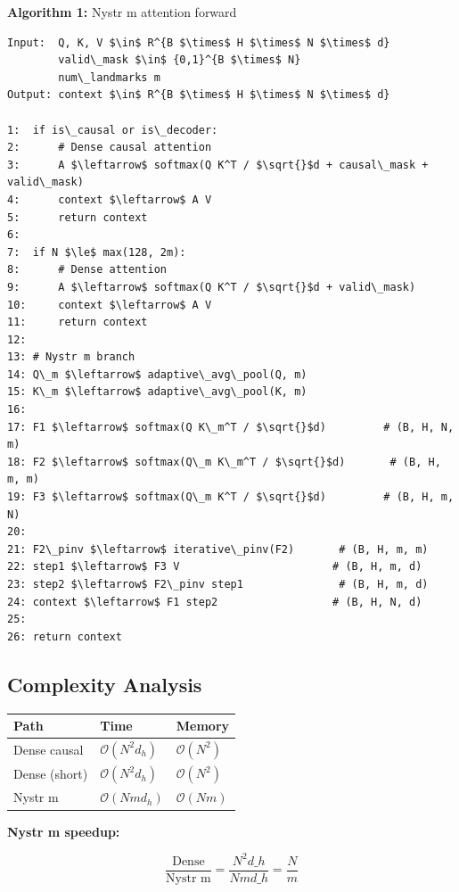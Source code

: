 \textbf{Algorithm 1:} Nystr m attention forward
\begin{lstlisting}
Input:  Q, K, V $\in$ R^{B $\times$ H $\times$ N $\times$ d}
        valid\_mask $\in$ {0,1}^{B $\times$ N}
        num\_landmarks m
Output: context $\in$ R^{B $\times$ H $\times$ N $\times$ d}

1:  if is\_causal or is\_decoder:
2:      # Dense causal attention
3:      A $\leftarrow$ softmax(Q K^T / $\sqrt{}$d + causal\_mask + valid\_mask)
4:      context $\leftarrow$ A V
5:      return context
6:
7:  if N $\le$ max(128, 2m):
8:      # Dense attention
9:      A $\leftarrow$ softmax(Q K^T / $\sqrt{}$d + valid\_mask)
10:     context $\leftarrow$ A V
11:     return context
12:
13: # Nystr m branch
14: Q\_m $\leftarrow$ adaptive\_avg\_pool(Q, m)
15: K\_m $\leftarrow$ adaptive\_avg\_pool(K, m)
16:
17: F1 $\leftarrow$ softmax(Q K\_m^T / $\sqrt{}$d)         # (B, H, N, m)
18: F2 $\leftarrow$ softmax(Q\_m K\_m^T / $\sqrt{}$d)       # (B, H, m, m)
19: F3 $\leftarrow$ softmax(Q\_m K^T / $\sqrt{}$d)         # (B, H, m, N)
20:
21: F2\_pinv $\leftarrow$ iterative\_pinv(F2)       # (B, H, m, m)
22: step1 $\leftarrow$ F3 V                        # (B, H, m, d)
23: step2 $\leftarrow$ F2\_pinv step1               # (B, H, m, d)
24: context $\leftarrow$ F1 step2                  # (B, H, N, d)
25:
26: return context
\end{lstlisting}

\subsection{Complexity Analysis}

\begin{table}[H]
\centering
\small
\begin{tabular}{lll}
\toprule
\textbf{Path} & \textbf{Time} & \textbf{Memory} \\
\midrule
Dense causal & $\mathcal{O}(N^2 d_h)$ & $\mathcal{O}(N^2)$ \\
Dense (short) & $\mathcal{O}(N^2 d_h)$ & $\mathcal{O}(N^2)$ \\
Nystr m & $\mathcal{O}(N m d_h)$ & $\mathcal{O}(N m)$ \\
\bottomrule
\end{tabular}
\end{table}

\textbf{Nystr m speedup:}

\[
\frac{\text{Dense}}{\text{Nystr m}} = \frac{N^2 d\_h}{N m d\_h} = \frac{N}{m}
\tag{4.4}
\]

